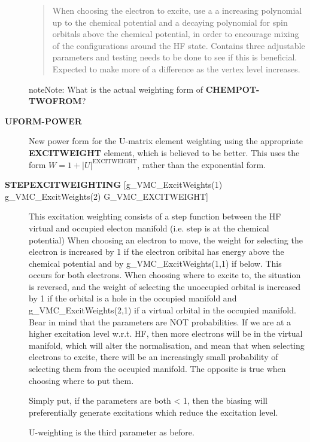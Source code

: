 \documentclass[openany,a4paper,10pt,english]{manual}
\begin{document}
\begin{description}
\begin{quote}
When choosing the electron to excite, use a a increasing polynomial
up to the chemical potential and a decaying polynomial for spin orbitals
above the chemical potential, in order to encourage mixing of
the configurations around the HF state. Contains three adjustable
parameters and testing needs to be done to see if this is
beneficial. Expected to make more of a difference as the vertex
level increases.
\end{quote}

\begin{notice}{note}{Note:}
What is the actual weighting form of \textbf{CHEMPOT-TWOFROM}?
\end{notice}

\item[\textbf{UFORM-POWER}] \leavevmode
New power form for the U-matrix element weighting using the
appropriate \textbf{EXCITWEIGHT} element, which is believed to be
better. This uses the form $W=1+|U|^{\text{EXCITWEIGHT}}$, rather than the
exponential form.

\item[\textbf{STEPEXCITWEIGHTING} {[}g\_VMC\_ExcitWeights(1) g\_VMC\_ExcitWeights(2) G\_VMC\_EXCITWEIGHT{]}] \leavevmode
This excitation weighting consists of a step function between the HF virtual and occupied electon manifold (i.e. step is at the chemical potential)
When choosing an electron to move, the weight for selecting the electron is increased by 1 if the electron oribital has energy above the chemical potential
and by g\_VMC\_ExcitWeights(1,1) if below. This occurs for both electrons. When choosing where to excite to, the situation is reversed, and the weight of selecting the
unoccupied orbital is increased by 1 if the orbital is a hole in the occupied manifold and g\_VMC\_ExcitWeights(2,1) if a virtual orbital in the occupied manifold.
Bear in mind that the parameters are NOT probabilities. If we are at a higher excitation level w.r.t. HF, then more electrons will be in the virtual manifold,
which will alter the normalisation, and mean that when selecting electrons to excite, there will be an increasingly small probability of selecting them from the
occupied manifold. The opposite is true when choosing where to put them.

Simply put, if the parameters are both \textless{} 1, then the biasing will preferentially generate excitations which reduce the excitation level.

U-weighting is the third parameter as before.

\end{description}
\end{document}
